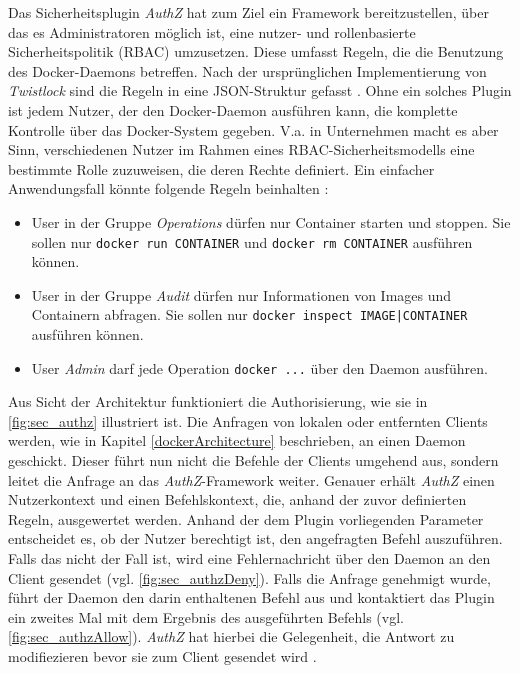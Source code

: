 \documentclass[../main.tex]{subfiles}
\begin{document}
    Das Sicherheitsplugin \emph{AuthZ} hat zum Ziel ein Framework bereitzustellen, über das es Administratoren möglich ist, eine nutzer- und rollenbasierte Sicherheitspolitik (\acrshort{RBAC}) umzusetzen. Diese umfasst Regeln, die die Benutzung des Docker-Daemons betreffen. Nach der ursprünglichen Implementierung von \emph{Twistlock} sind die Regeln in eine JSON-Struktur gefasst \cite{githubAuthZJSON}. Ohne ein solches Plugin ist jedem Nutzer, der den Docker-Daemon ausführen kann, die komplette Kontrolle über das Docker-System gegeben. V.a. in Unternehmen macht es aber Sinn, verschiedenen Nutzer im Rahmen eines RBAC-Sicherheitsmodells eine bestimmte Rolle zuzuweisen, die deren Rechte definiert. Ein einfacher Anwendungsfall könnte folgende Regeln beinhalten \cite{authzTwistlock}:

    \begin{itemize}
        \item User in der Gruppe \emph{Operations} dürfen nur Container starten und stoppen. Sie sollen nur \texttt{docker run CONTAINER} und \texttt{docker rm CONTAINER} ausführen können.
        \item User in der Gruppe \emph{Audit} dürfen nur Informationen von Images und Containern abfragen. Sie sollen nur \texttt{docker inspect IMAGE|CONTAINER} ausführen können.
        \item User \emph{Admin} darf jede Operation \texttt{docker ...} über den Daemon ausführen.
    \end{itemize}

    Aus Sicht der Architektur funktioniert die Authorisierung, wie sie in \fig \ref{fig:sec_authz} illustriert ist. Die Anfragen von lokalen oder entfernten Clients werden, wie in Kapitel \ref{dockerArchitecture} beschrieben, an einen Daemon geschickt. Dieser führt nun nicht die Befehle der Clients umgehend aus, sondern leitet die Anfrage an das \emph{AuthZ}-Framework weiter. Genauer erhält \emph{AuthZ} einen Nutzerkontext und einen Befehlskontext, die, anhand der zuvor definierten Regeln, ausgewertet werden. Anhand der dem Plugin vorliegenden Parameter entscheidet es, ob der Nutzer berechtigt ist, den angefragten Befehl auszuführen. Falls das nicht der Fall ist, wird eine Fehlernachricht über den Daemon an den Client gesendet (vgl. \fig \ref{fig:sec_authzDeny}). Falls die Anfrage genehmigt wurde, führt der Daemon den darin enthaltenen Befehl aus und kontaktiert das Plugin ein zweites Mal mit dem Ergebnis des ausgeführten Befehls (vgl. \fig \ref{fig:sec_authzAllow}). \emph{AuthZ} hat hierbei die Gelegenheit, die Antwort zu modifiezieren bevor sie zum Client gesendet wird \cite{githubAuthZDraft}\cite{authzTwistlock}.
\end{document}
